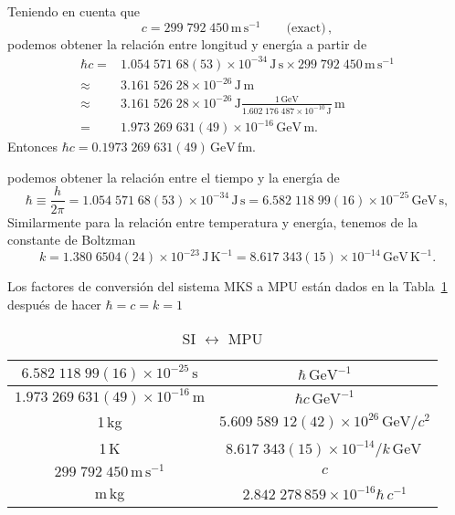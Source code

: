 \begin{frame}
Teniendo en cuenta que \cite{PDG}
\begin{equation}
    c=299\;792\;450\,\text{m}\,\text{s}^{-1}\qquad\text{(exact)}\,,
\end{equation}
podemos obtener la relaci\'on entre longitud y energ\'\i a a partir de
\begin{align}
  \hbar c=&1.054\;571\;68(53)\times10^{-34}\,\text{J}\,\text{s}\times299\;792\;450\,\text{m}\,\text{s}^{-1} \nonumber\\
  \approx&3.161\;526\;28\times10^{-26}\,\text{J}\,\text{m}\nonumber\\
  \approx&3.161\;526\;28\times10^{-26}\,{\text{J}}\frac{1\,\text{GeV}}{1.602\;176\;487\times10^{-10}\,\text{J}}\,\text{m}\nonumber\\
  =&1.973\;269\;631(49)\times10^{-16}\,\text{GeV}\,\text{m}.
\end{align}
Entonces $\hbar c =0.1973\;269\;631(49)\,\text{GeV}\,\text{fm}$.

podemos obtener la relaci\'on entre el tiempo y la energ\'\i a de
\begin{equation}
  \hbar\equiv\frac{h}{2\pi}=1.054\;571\;68(53)\times10^{-34}\,\text{J}\,\text{s}
  =6.582\;118\;99(16)\times10^{-25}\,\text{GeV}\,\text{s},
\end{equation}
Similarmente para la relaci\'on entre temperatura y energ\'\i a, tenemos de la constante de Boltzman
\begin{equation}
  k=1.380\;6504(24)\times10^{-23}\,\text{J}\,\text{K}^{-1}=8.617\;343(15)\times10^{-14}\,\text{GeV}\,\text{K}^{-1}.
\end{equation}


Los factores de conversi\'on del sistema MKS a MPU est\'an dados en la Tabla~\ref{tab:mks2mpu} despu\'es de hacer $\hbar=c=k=1$

\begin{table} %
  \centering %
  \begin{tabular}{c|c} %
$6.582\;118\;99(16)\times10^{-25}\,\text{s}$ & $ {\hbar}\,\text{GeV}^{-1}$\\\hline
$1.973\;269\;631(49)\times10^{-16}\,\text{m}$ & $ {\hbar c}\,\text{GeV}^{-1} $\\ \hline
1\,kg& $5.609\;589\;12(42)\times10^{26}\,\text{GeV}/c^2$ \\ \hline
1\,K & $8.617\;343(15)\times10^{-14}/k\,\text{GeV}$\,\\ \hline
$299\;792\;450\,\text{m}\,\text{s}^{-1}$&$c$\\ \hline
m\,kg&$2.842\;278\,859\times10^{-16}\hbar\,c^{-1}$\\ \hline
  \end{tabular} %
  \caption{SI $\leftrightarrow$ MPU} %
  \label{tab:mks2mpu} %
\end{table} %


\end{frame}

